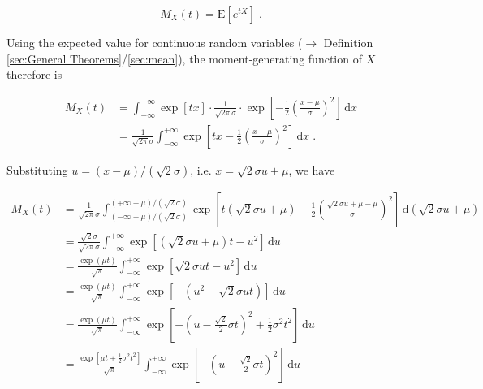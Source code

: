 \documentclass[a4paper,12pt,twoside]{book}
\begin{document}
\begin{equation} \label{eq:norm-mgf-mgf-var}
M_X(t) = \mathrm{E} \left[ e^{tX} \right] \; .
\end{equation}

Using the expected value for continuous random variables ($\rightarrow$ Definition \ref{sec:General Theorems}/\ref{sec:mean}), the moment-generating function of $X$ therefore is

\begin{equation} \label{eq:norm-mgf-norm-mgf-s1}
\begin{split}
M_X(t) &= \int_{-\infty}^{+\infty} \exp[tx] \cdot \frac{1}{\sqrt{2 \pi} \sigma} \cdot \exp \left[ -\frac{1}{2} \left( \frac{x-\mu}{\sigma} \right)^2 \right] \, \mathrm{d}x \\
&= \frac{1}{\sqrt{2 \pi} \sigma} \int_{-\infty}^{+\infty} \exp\left[ tx - \frac{1}{2} \left( \frac{x-\mu}{\sigma} \right)^2 \right] \, \mathrm{d}x \; .
\end{split}
\end{equation}

Substituting $u = (x-\mu)/(\sqrt{2}\sigma)$, i.e. $x = \sqrt{2}\sigma u + \mu$, we have

\begin{equation} \label{eq:norm-mgf-norm-mgf-s2}
\begin{split}
M_X(t) &= \frac{1}{\sqrt{2 \pi} \sigma} \int_{(-\infty-\mu)/(\sqrt{2}\sigma)}^{(+\infty-\mu)/(\sqrt{2}\sigma)} \exp\left[ t\left( \sqrt{2} \sigma u + \mu \right) - \frac{1}{2} \left( \frac{ \sqrt{2} \sigma u + \mu - \mu}{\sigma} \right)^2 \right] \, \mathrm{d}\left( \sqrt{2} \sigma u + \mu \right) \\
&= \frac{\sqrt{2} \sigma}{\sqrt{2 \pi} \sigma} \int_{-\infty}^{+\infty} \exp\left[ \left( \sqrt{2} \sigma u + \mu \right) t - u^2 \right] \, \mathrm{d}u \\
&= \frac{\exp(\mu t)}{\sqrt{\pi}} \int_{-\infty}^{+\infty} \exp\left[ \sqrt{2} \sigma u t - u^2 \right] \, \mathrm{d}u \\
&= \frac{\exp(\mu t)}{\sqrt{\pi}} \int_{-\infty}^{+\infty} \exp\left[ - \left( u^2 - \sqrt{2} \sigma u t \right) \right] \, \mathrm{d}u \\
&= \frac{\exp(\mu t)}{\sqrt{\pi}} \int_{-\infty}^{+\infty} \exp\left[ - \left( u - \frac{\sqrt{2}}{2} \sigma t \right)^2 + \frac{1}{2} \sigma^2 t^2 \right] \, \mathrm{d}u \\
&= \frac{\exp\left[ \mu t + \frac{1}{2} \sigma^2 t^2 \right]}{\sqrt{\pi}} \int_{-\infty}^{+\infty} \exp\left[ - \left( u - \frac{\sqrt{2}}{2} \sigma t \right)^2 \right] \, \mathrm{d}u
\end{split}
\end{equation}
\end{document}
